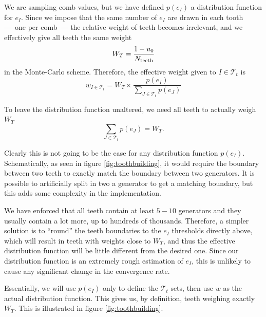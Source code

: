 \documentclass[./thesis.tex]{subfiles}
\begin{document}
We are sampling comb values, but we have defined $p(e_I)$ a distribution function for $e_I$. Since we impose that the same number of $e_I$ are drawn in each tooth ---~one per comb~--- the relative weight of teeth becomes irrelevant, and we effectively give all teeth the same weight 
\begin{equation}
W_T=\frac{1-u_0}{N_\text{teeth}}
\end{equation}
in the Monte-Carlo scheme. Therefore, the effective weight given to $I \in \mathcal{T}_t$ is
\begin{equation}
w_{I \in \mathcal{T}_t} = W_T \times \frac{p(e_I)}{\sum_{J \in \mathcal{T}_t} p(e_J)}
\end{equation}

To leave the distribution function unaltered, we need all teeth to actually weigh $W_T$
\begin{equation}
\sum_{J \in \mathcal{T}_t} p(e_J) = W_T.
\end{equation}

Clearly this is not going to be the case for any distribution function $p(e_I)$. Schematically, as seen in figure \ref{fig:toothbuilding}, it would require the boundary between two teeth to exactly match the boundary between two generators. It is possible to artificially split in two a generator to get a matching boundary, but this adds some complexity in the implementation.

We have enforced that all teeth contain at least $5-10$ generators and they usually contain a lot more, up to hundreds of thousands. Therefore, a simpler solution is to ``round'' the teeth boundaries to the $e_I$ thresholds directly above, which will result in teeth with weights close to $W_T$, and thus the effective distribution function will be little different from the desired one. Since our distribution function is an extremely rough estimation of $e_I$, this is unlikely to cause any significant change in the convergence rate.

Essentially, we will use $p(e_I)$ only to define the $\mathcal{T}_t$ sets, then use $w$ as the actual distribution function. This gives us, by definition, teeth weighing exactly $W_T$.
This is illustrated in figure \ref{fig:toothbuilding}.
 
\end{document}
